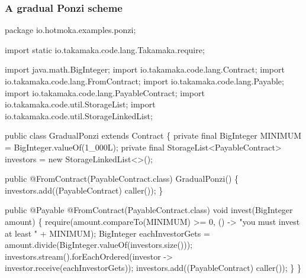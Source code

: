 \documentclass[11pt]{beamer}  %
\begin{document}
\begin{frame}[fragile]\frametitle{A gradual Ponzi scheme}

{\tiny\begin{semiverbatim}
package io.hotmoka.examples.ponzi;

import static io.takamaka.code.lang.Takamaka.require;

import java.math.BigInteger;
import io.takamaka.code.lang.Contract;
import io.takamaka.code.lang.FromContract;
import io.takamaka.code.lang.Payable;
import io.takamaka.code.lang.PayableContract;
import io.takamaka.code.util.StorageList;
import io.takamaka.code.util.StorageLinkedList;

public class GradualPonzi extends Contract \{
  private final BigInteger MINIMUM = BigInteger.valueOf(1_000L);
  private final {\color{red}StorageList<PayableContract> investors = new StorageLinkedList<>();}

  public {\color{violet}@FromContract(PayableContract.class)} GradualPonzi() \{
    investors.add({\color{violet}(PayableContract) caller()});
  \}

  public {\color{airforceblue}@Payable} {\color{violet}@FromContract(PayableContract.class)} void invest({\color{airforceblue}BigInteger amount}) \{
    require(amount.compareTo(MINIMUM) >= 0, () -> "you must invest at least " + MINIMUM);
    BigInteger eachInvestorGets = amount.divide(BigInteger.valueOf(investors.size()));
    investors.stream().forEachOrdered(investor -> investor.receive(eachInvestorGets));
    investors.add({\color{violet}(PayableContract) caller()});
  \}
\}
\end{semiverbatim}}

\end{frame}
\end{document}
